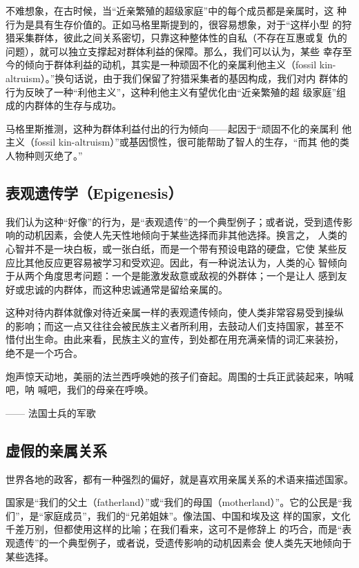 不难想象，在古时候，当“近亲繁殖的超级家庭”中的每个成员都是亲属时，这 种行为是具有生存价值的。正如马格里斯提到的，很容易想象，对于“这样小型 的狩猎采集群体，彼此之间关系密切，只靠这种整体性的自私（不存在互惠或复 仇的问题），就可以独立支撑起对群体利益的保障。那么，我们可以认为，某些 幸存至今的倾向于群体利益的动机，其实是一种顽固不化的亲属利他主义（fossil kin-altruism）。”换句话说，由于我们保留了狩猎采集者的基因构成，我们对内 群体的行为反映了一种“利他主义”，这种利他主义有望优化由“近亲繁殖的超 级家庭”组成的内群体的生存与成功。

马格里斯推测，这种为群体利益付出的行为倾向——起因于“顽固不化的亲属利 他主义（fossil kin-altruism）”或基因惯性，很可能帮助了智人的生存，“而其 他的类人物种则灭绝了。” 

\subsection{表观遗传学（Epigenesis）}

我们认为这种“好像”的行为，是“表观遗传”的一个典型例子；或者说，受到遗传影响的动机因素，会使人先天性地倾向于某些选择而非其他选择。换言之， 人类的心智并不是一块白板，或一张白纸，而是一个带有预设电路的硬盘，它使 某些反应比其他反应更容易被学习和受欢迎。因此，有一种说法认为，人类的心 智倾向于从两个角度思考问题：一个是能激发敌意或敌视的外群体；一个是让人 感到友好或忠诚的内群体，而这种忠诚通常是留给亲属的。

这种对待内群体就像对待近亲属一样的表观遗传倾向，使人类非常容易受到操纵 的影响；而这一点又往往会被民族主义者所利用，去鼓动人们支持国家，甚至不 惜付出生命。由此来看，民族主义的宣传，到处都在用充满亲情的词汇来装扮， 绝不是一个巧合。

\begin{tcolorbox}
炮声惊天动地，美丽的法兰西呼唤她的孩子们奋起。周围的士兵正武装起来，呐喊吧，呐 喊吧，我们的母亲在呼唤。
\begin{flushright}
—— 法国士兵的军歌
\end{flushright}
\end{tcolorbox}

\subsection{虚假的亲属关系}

世界各地的政客，都有一种强烈的偏好，就是喜欢用亲属关系的术语来描述国家。

国家是“我们的父土（fatherland）”或“我们的母国（motherland）”。它的公民是“我们”，是“家庭成员”，我们的“兄弟姐妹”。像法国、中国和埃及这 样的国家，文化千差万别，但都使用这样的比喻；在我们看来，这可不是修辞上 的巧合，而是“表观遗传”的一个典型例子，或者说，受遗传影响的动机因素会 使人类先天地倾向于某些选择。

